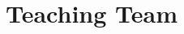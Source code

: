 \documentclass[12pt]{article}
\numberwithin{equation}{section}    %
\begin{document}

\section*{Teaching Team}
\end{document}
